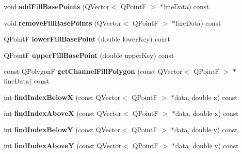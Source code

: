 \begin{DoxyCompactItemize}
\item 
\hypertarget{classQCPGraph_a5fa7884620d7c54b81dfbd255d97b636}{void {\bfseries add\-Fill\-Base\-Points} (Q\-Vector$<$ Q\-Point\-F $>$ $\ast$line\-Data) const }\label{classQCPGraph_a5fa7884620d7c54b81dfbd255d97b636}

\item 
\hypertarget{classQCPGraph_ad31b49a90e91e538fd9caf011c913a68}{void {\bfseries remove\-Fill\-Base\-Points} (Q\-Vector$<$ Q\-Point\-F $>$ $\ast$line\-Data) const }\label{classQCPGraph_ad31b49a90e91e538fd9caf011c913a68}

\item 
\hypertarget{classQCPGraph_a41f982e8ceaefe6a53eb7432f26d64b6}{Q\-Point\-F {\bfseries lower\-Fill\-Base\-Point} (double lower\-Key) const }\label{classQCPGraph_a41f982e8ceaefe6a53eb7432f26d64b6}

\item 
\hypertarget{classQCPGraph_a363d066c179e0f46cc93c12bafb0bfba}{Q\-Point\-F {\bfseries upper\-Fill\-Base\-Point} (double upper\-Key) const }\label{classQCPGraph_a363d066c179e0f46cc93c12bafb0bfba}

\item 
\hypertarget{classQCPGraph_a0374b7268e35cab9802a6be2b5d726d7}{const Q\-Polygon\-F {\bfseries get\-Channel\-Fill\-Polygon} (const Q\-Vector$<$ Q\-Point\-F $>$ $\ast$line\-Data) const }\label{classQCPGraph_a0374b7268e35cab9802a6be2b5d726d7}

\item 
\hypertarget{classQCPGraph_a6f4e9461d5925be9228fc4760249a04f}{int {\bfseries find\-Index\-Below\-X} (const Q\-Vector$<$ Q\-Point\-F $>$ $\ast$data, double x) const }\label{classQCPGraph_a6f4e9461d5925be9228fc4760249a04f}

\item 
\hypertarget{classQCPGraph_abab2a75b5e63630432bdd1f3b57f07fa}{int {\bfseries find\-Index\-Above\-X} (const Q\-Vector$<$ Q\-Point\-F $>$ $\ast$data, double x) const }\label{classQCPGraph_abab2a75b5e63630432bdd1f3b57f07fa}

\item 
\hypertarget{classQCPGraph_a6c4d556de3d1e02f548401001f72c6ff}{int {\bfseries find\-Index\-Below\-Y} (const Q\-Vector$<$ Q\-Point\-F $>$ $\ast$data, double y) const }\label{classQCPGraph_a6c4d556de3d1e02f548401001f72c6ff}

\item 
\hypertarget{classQCPGraph_adf50243f1df203883a2187089734bfcb}{int {\bfseries find\-Index\-Above\-Y} (const Q\-Vector$<$ Q\-Point\-F $>$ $\ast$data, double y) const }\label{classQCPGraph_adf50243f1df203883a2187089734bfcb}


\end{DoxyCompactItemize}
